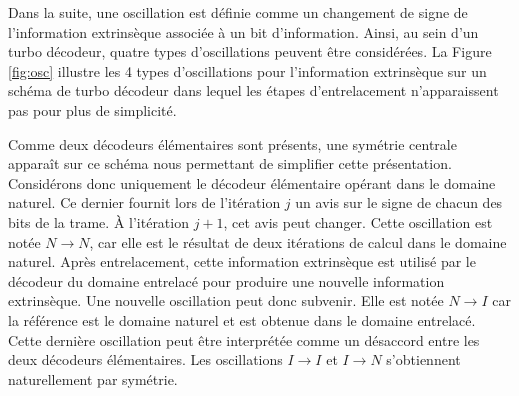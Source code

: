 

Dans la suite, une oscillation est définie comme un changement de signe de l'information extrinsèque associée à un bit
d'information. Ainsi, au sein d'un turbo décodeur, quatre types d'oscillations peuvent être considérées. La Figure 
\ref{fig:osc} illustre les 4 types d’oscillations pour l'information extrinsèque sur un schéma de turbo décodeur dans 
lequel les étapes d'entrelacement n’apparaissent pas pour plus de simplicité.

Comme deux décodeurs élémentaires sont présents, une symétrie centrale apparaît sur ce schéma nous permettant de simplifier
cette présentation. Considérons donc uniquement le décodeur élémentaire opérant dans le domaine naturel. Ce dernier 
fournit lors de l'itération $j$ un avis sur le signe de chacun des bits de la trame. À l'itération $j+1$, cet avis peut
changer. Cette oscillation est notée $N\rightarrow N$, car elle est le résultat de deux itérations de calcul dans le 
domaine naturel. Après entrelacement, cette information extrinsèque est utilisé par le décodeur du domaine entrelacé 
pour produire une nouvelle information extrinsèque. Une nouvelle oscillation peut donc subvenir. Elle est notée $N\rightarrow I$
car la référence est le domaine naturel et est obtenue dans le domaine entrelacé. Cette dernière oscillation peut être 
interprétée comme un désaccord entre les deux décodeurs élémentaires. Les oscillations $I\rightarrow I$ et $I\rightarrow N$
s'obtiennent naturellement par symétrie.

